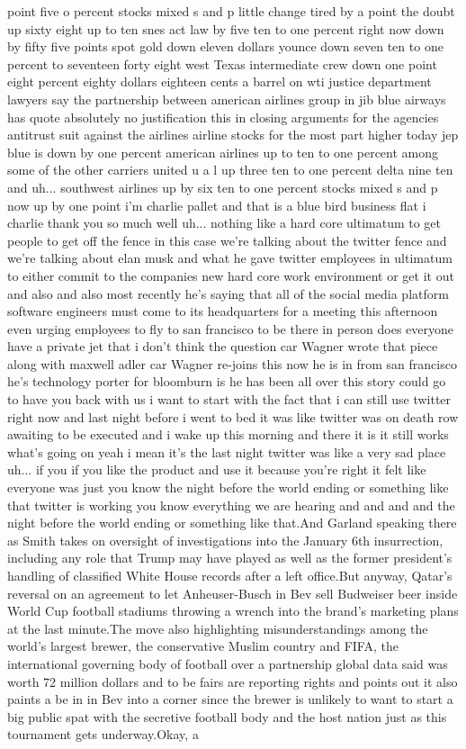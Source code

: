 \documentclass{article}%
\begin{document}
point five o percent stocks mixed s and p little change tired by a point the doubt up sixty eight up to ten snes act law by five ten to one percent right now down by fifty five points spot gold down eleven dollars younce down seven ten to one percent to seventeen forty eight west Texas intermediate crew down one point eight percent eighty dollars eighteen cents a barrel on wti justice department lawyers say the partnership between american airlines group in jib blue airways has quote absolutely no justification this in closing arguments for the agencies antitrust suit against the airlines airline stocks for the most part higher today jep blue is down by one percent american airlines up to ten to one percent among some of the other carriers united u a l up three ten to one percent delta nine ten and uh... southwest airlines up by six ten to one percent stocks mixed s and p now up by one point i'm charlie pallet and that is a blue bird business flat i charlie thank you so much well uh... nothing like a hard core ultimatum to get people to get off the fence in this case we're talking about the twitter fence and we're talking about elan musk and what he gave twitter employees in ultimatum to either commit to the companies new hard core work environment or get it out and also and also most recently he's saying that all of the social media platform software engineers must come to its headquarters for a meeting this afternoon even urging employees to fly to san francisco to be there in person does everyone have a private jet that i don't think the question car Wagner wrote that piece along with maxwell adler car Wagner re{-}joins this now he is in from san francisco he's technology porter for bloomburn is he has been all over this story could go to have you back with us i want to start with the fact that i can still use twitter right now and last night before i went to bed it was like twitter was on death row awaiting to be executed and i wake up this morning and there it is it still works what's going on yeah i mean it's the last night twitter was like a very sad place uh... if you if you like the product and use it because you're right it felt like everyone was just you know the night before the world ending or something like that twitter is working you know everything we are hearing and and and and  the night before the world ending or something like that.And Garland speaking there as Smith takes on oversight of investigations into the January 6th insurrection, including any role that Trump may have played as well as the former president's handling of classified White House records after a left office.But anyway, Qatar's reversal on an agreement to let Anheuser{-}Busch in Bev sell Budweiser beer inside World Cup football stadiums throwing a wrench into the brand's marketing plans at the last minute.The move also highlighting misunderstandings among the world's largest brewer, the conservative Muslim country and FIFA, the international governing body of football over a partnership global data said was worth 72 million dollars and to be fairs are reporting rights and points out it also paints a be in in Bev into a corner since the brewer is unlikely to want to start a big public spat with the secretive football body and the host nation just as this tournament gets underway.Okay, a 
\end{document}

